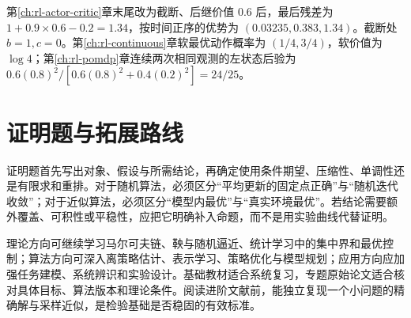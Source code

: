 \documentclass[UTF8,12pt,a4paper,fontset=fandol]{ctexbook}
\begin{document}
第\ref{ch:rl-actor-critic}章末尾改为截断、后继价值 $0.6$ 后，最后残差为 $1+0.9\times0.6-0.2=1.34$，按时间正序的优势为 $(0.03235,0.383,1.34)$。截断处 $b=1,c=0$。第\ref{ch:rl-continuous}章软最优动作概率为 $(1/4,3/4)$，软价值为 $\log4$；第\ref{ch:rl-pomdp}章连续两次相同观测的左状态后验为 $0.6(0.8)^2/[0.6(0.8)^2+0.4(0.2)^2]=24/25$。

\section{证明题与拓展路线}

证明题首先写出对象、假设与所需结论，再确定使用条件期望、压缩性、单调性还是有限求和重排。对于随机算法，必须区分“平均更新的固定点正确”与“随机迭代收敛”；对于近似算法，必须区分“模型内最优”与“真实环境最优”。若结论需要额外覆盖、可积性或平稳性，应把它明确补入命题，而不是用实验曲线代替证明。

理论方向可继续学习马尔可夫链、鞅与随机逼近、统计学习中的集中界和最优控制；算法方向可深入离策略估计、表示学习、策略优化与模型规划；应用方向应加强任务建模、系统辨识和实验设计。基础教材\cite{sutton-barto}适合系统复习，专题原始论文适合核对具体目标、算法版本和理论条件。阅读进阶文献前，能独立复现一个小问题的精确解与采样近似，是检验基础是否稳固的有效标准。
\end{document}
